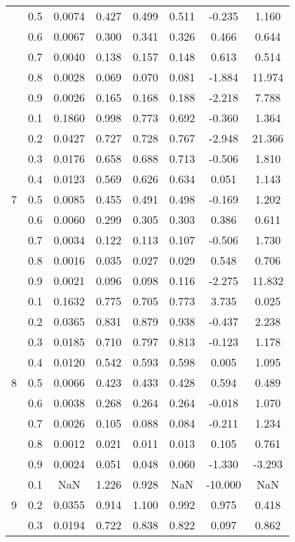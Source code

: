 \documentclass[11pt,a4paper]{report}
\begin{document}
\begin{longtable}{ | c | c || c | c | c | c | c | c | }
 & 0.5 & 0.0074 & 0.427 & 0.499 & 0.511 & -0.235 & 1.160 \\
 & 0.6 & 0.0067 & 0.300 & 0.341 & 0.326 & 0.466 & 0.644 \\
 & 0.7 & 0.0040 & 0.138 & 0.157 & 0.148 & 0.613 & 0.514 \\
 & 0.8 & 0.0028 & 0.069 & 0.070 & 0.081 & -1.884 & 11.974 \\
 & 0.9 & 0.0026 & 0.165 & 0.168 & 0.188 & -2.218 & 7.788 \\
 \hline
\multirow{9}{*}{7} & 0.1 & 0.1860 & 0.998 & 0.773 & 0.692 & -0.360 & 1.364 \\
 & 0.2 & 0.0427 & 0.727 & 0.728 & 0.767 & -2.948 & 21.366 \\
 & 0.3 & 0.0176 & 0.658 & 0.688 & 0.713 & -0.506 & 1.810 \\
 & 0.4 & 0.0123 & 0.569 & 0.626 & 0.634 & 0.051 & 1.143 \\
 & 0.5 & 0.0085 & 0.455 & 0.491 & 0.498 & -0.169 & 1.202 \\
 & 0.6 & 0.0060 & 0.299 & 0.305 & 0.303 & 0.386 & 0.611 \\
 & 0.7 & 0.0034 & 0.122 & 0.113 & 0.107 & -0.506 & 1.730 \\
 & 0.8 & 0.0016 & 0.035 & 0.027 & 0.029 & 0.548 & 0.706 \\
 & 0.9 & 0.0021 & 0.096 & 0.098 & 0.116 & -2.275 & 11.832 \\
 \hline
\multirow{9}{*}{8} & 0.1 & 0.1632 & 0.775 & 0.705 & 0.773 & 3.735 & 0.025 \\
 & 0.2 & 0.0365 & 0.831 & 0.879 & 0.938 & -0.437 & 2.238 \\
 & 0.3 & 0.0185 & 0.710 & 0.797 & 0.813 & -0.123 & 1.178 \\
 & 0.4 & 0.0120 & 0.542 & 0.593 & 0.598 & 0.005 & 1.095 \\
 & 0.5 & 0.0066 & 0.423 & 0.433 & 0.428 & 0.594 & 0.489 \\
 & 0.6 & 0.0038 & 0.268 & 0.264 & 0.264 & -0.018 & 1.070 \\
 & 0.7 & 0.0026 & 0.105 & 0.088 & 0.084 & -0.211 & 1.234 \\
 & 0.8 & 0.0012 & 0.021 & 0.011 & 0.013 & 0.105 & 0.761 \\
 & 0.9 & 0.0024 & 0.051 & 0.048 & 0.060 & -1.330 & -3.293 \\
 \hline
\multirow{9}{*}{9} & 0.1 & NaN & 1.226 & 0.928 & NaN & -10.000 & NaN \\
 & 0.2 & 0.0355 & 0.914 & 1.100 & 0.992 & 0.975 & 0.418 \\
 & 0.3 & 0.0194 & 0.722 & 0.838 & 0.822 & 0.097 & 0.862 \\

\end{longtable}
\end{document}
